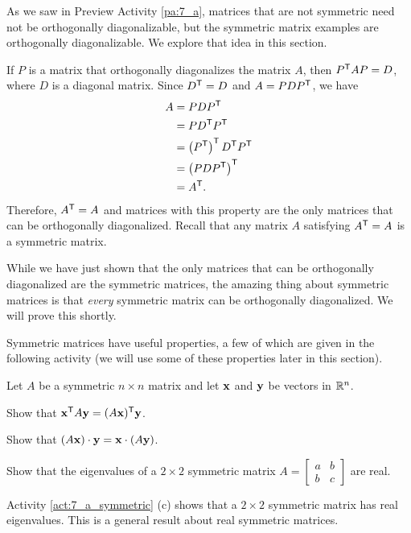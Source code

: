 \label{sec:mtx_symm}

As we saw in Preview Activity \ref{pa:7_a}, matrices that are not symmetric need not be orthogonally diagonalizable, but the symmetric matrix examples are orthogonally diagonalizable. We explore that idea in this section. 

 If $P$ is a matrix that orthogonally diagonalizes the matrix $A$, then $P^{\mathsf{T}}AP = D$, where $D$ is a diagonal matrix. Since $D^{\mathsf{T}} = D$ and $A = PDP^{\mathsf{T}}$, we have
\begin{align*}
A &= PDP^{\mathsf{T}} \\
    &= PD^{\mathsf{T}}P^{\mathsf{T}} \\
    &= \left(P^{\mathsf{T}}\right)^{\mathsf{T}}D^{\mathsf{T}}P^{\mathsf{T}} \\
    &= \left(PDP^{\mathsf{T}}\right)^{\mathsf{T}} \\
    &= A^{\mathsf{T}}.
\end{align*}
Therefore, $A^{\mathsf{T}} = A$ and matrices with this property are the only matrices that can be orthogonally diagonalized. Recall that any matrix $A$ satisfying $A^{\mathsf{T}} = A$ is a symmetric matrix. 

While we have just shown that the only matrices that can be orthogonally diagonalized are the symmetric matrices, the amazing thing about symmetric matrices is that \emph{every} symmetric matrix can be orthogonally diagonalized. We will prove this shortly.

Symmetric matrices have useful properties, a few of which are given in the following activity (we will use some of these properties later in this section).


\begin{activity} \label{act:7_a_symmetric} Let $A$ be a symmetric $n \times n$ matrix and let $\mathbf{x}$ and $\mathbf{y}$ be vectors in $\mathbb{R}^n$.
	\ba
	\item Show that $\mathbf{x}^{\mathsf{T}} A \mathbf{y} = (A\mathbf{x})^{\mathsf{T}} \mathbf{y}$.
	
	
	\item Show that $(A\mathbf{x}) \cdot \mathbf{y} = \mathbf{x} \cdot (A\mathbf{y})$.
	

	\item Show that the eigenvalues of a $2 \times 2$ symmetric matrix $A = \left[ \begin{array}{cc} a&b\\b&c \end{array} \right]$ are real.	
	
	\ea
\end{activity}

Activity \ref{act:7_a_symmetric} (c) shows that a $2 \times 2$ symmetric matrix has real eigenvalues. This is a general result about real symmetric matrices.

